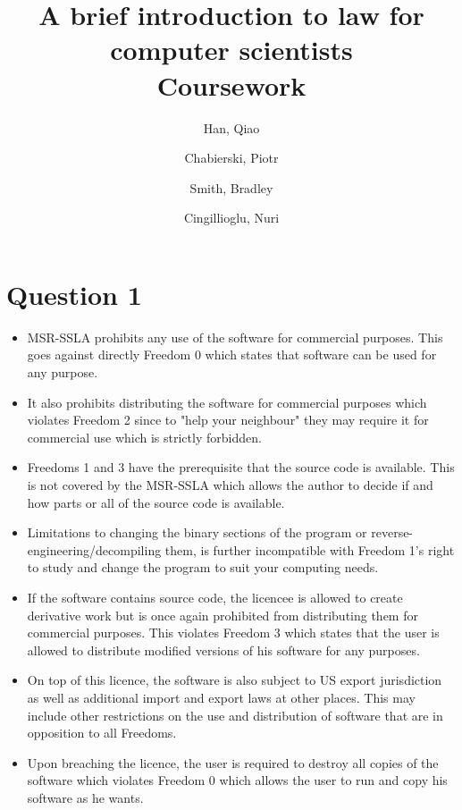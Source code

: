 \documentclass[10pt,a4paper]{article}
\begin{document}
\title{A brief introduction to law for computer
scientists \\
Coursework}
\author{
  Han, Qiao\\
  \and
  Chabierski, Piotr\\
  \and
  Smith, Bradley\\
  \and
  Cingillioglu, Nuri\\
}

\maketitle

\section*{Question 1}
\begin{itemize}
\item MSR-SSLA prohibits any use of the software for commercial purposes. This goes against directly Freedom 0 which states that software can be used for any purpose.
\item It also prohibits distributing the software for commercial purposes which violates Freedom 2 since to "help your neighbour" they may require it for commercial use which is strictly forbidden.
\item Freedoms 1 and 3 have the prerequisite that the source code is available. This is not covered by the MSR-SSLA which allows the author to decide if and how parts or all of the source code is available.
\item Limitations to changing the binary sections of the program or reverse-engineering/decompiling them, is further incompatible with Freedom 1's right to study and change the program to suit your computing needs.
\item If the software contains source code, the licencee is allowed to create derivative work but is once again prohibited from distributing them for commercial purposes. This violates Freedom 3 which states that the user is allowed to distribute modified versions of his software for any purposes.
\item On top of this licence, the software is also subject to US export jurisdiction as well as additional import and export laws at other places. This may include other restrictions on the use and distribution of software that are in opposition to all Freedoms.
\item Upon breaching the licence, the user is required to destroy all copies of the software which violates Freedom 0 which allows the user to run and copy his software as he wants.
\end{itemize}
\end{document}
